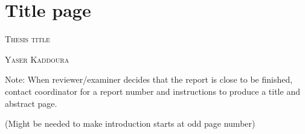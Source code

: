 \documentclass[a4paper, 12pt]{report}
\begin{document}

\thispagestyle{empty}
\section*{Title page}

\textsc{\large Thesis title }

\textsc{\large Yaser Kaddoura}

Note: When reviewer/examiner decides that the report is close to be finished,
contact coordinator for a report number and instructions to produce a title and
abstract page.

\newpage\null\thispagestyle{blank}\newpage

\thispagestyle{empty}


\newpage\null\thispagestyle{blank}\newpage

\tableofcontents

\newpage

\listoffigures

\newpage

\listoftables
\newpage




\newpage
\newpage\null(Might be needed to make introduction starts at odd page number)
\thispagestyle{blank}\newpage





\newpage



\newpage



\newpage



\newpage

\printbibliography[heading=bibintoc, title={References}]
\end{document}
